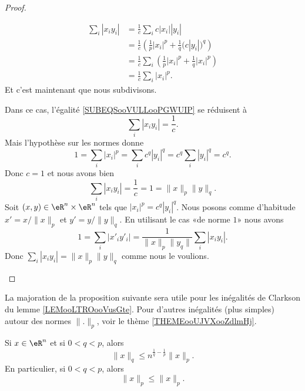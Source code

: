 \begin{proof}
\begin{subproof}
\begin{subequations}
			\begin{align}
				\sum_i| x_iy_i | & =\frac{1}{ c }\sum_ic| x_i | |y_i |                                                     \\
				                 & =\frac{1}{ c }\left( \frac{1}{ p }| x_i |^p+\frac{1}{ q }\big( c| y_i | \big)^q \right) \\
				                 & =\frac{1}{ c }\sum_i\left( \frac{1}{ p }| x_i |^p+\frac{1}{ q }| x_i |^p \right)        \\
				                 & =\frac{1}{ c }\sum_i| x_i |^p.
			\end{align}
		\end{subequations}
		Et c'est maintenant que nous subdivisons.
		\begin{subproof}
			\spitem[Si \( \| x \|_p=\| y \|_q=1\)]
			Dans ce cas, l'égalité \eqref{SUBEQSooVULLooPGWUIP} se réduisent à
			\begin{equation}
				\sum_i| x_iy_i |=\frac{1}{ c }.
			\end{equation}
			Mais l'hypothèse sur les normes donne
			\begin{equation}
				1=\sum_i| x_i |^p=\sum_ic^q| y_i |^q=c^q\sum_i| y_i |^q=c^q.
			\end{equation}
			Donc \( c=1\) et nous avons bien
			\begin{equation}
				\sum_i| x_iy_i |=\frac{1}{ c }=1=\| x \|_p\| y \|_q.
			\end{equation}
			Soit \( (x,y)\in \eR^n\times \eR^n\) tels que \( | x_i |^p=c^q| y_i |^q\). Nous posons comme d'habitude \( x'=x/\| x \|_p\) et \( y'=y/\| y \|_q\). En utilisant le cas «de norme \( 1\)» nous avons
			\begin{equation}
				1=\sum_i| x'_iy'_i |=\frac{1}{ \| x \|_p\| y_q \| }\sum_i| x_iy_i |.
			\end{equation}
			Donc \( \sum_i| x_iy_i |=\| x \|_p\| y \|_q\) comme nous le voulions.
		\end{subproof}
	\end{subproof}
\end{proof}

La majoration de la proposition suivante sera utile pour les inégalités de Clarkson du lemme \ref{LEMooLTROooVusGte}. Pour d'autres inégalités (plus simples) autour des normes \( \| . \|_p\), voir le thème \ref{THEMEooUJVXooZdlmHj}.
\begin{proposition}       \label{PROPooQZTNooGACMlQ}
	Si \( x\in \eR^n\) et si \( 0<q<p\), alors
	\begin{equation}
		\| x \|_q\leq n^{\frac{1}{ q }-\frac{1}{ p }}   \| x \|_p.
	\end{equation}
	En particulier, si \( 0 < q < p\), alors
	\begin{equation}
		\| x \|_p\leq \| x \|_p.
	\end{equation}
\end{proposition}


